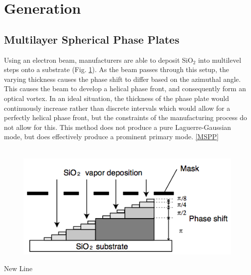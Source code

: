 \documentclass[10pt]{article}
\begin{document}
\section*{Generation}
\subsection*{Multilayer Spherical Phase Plates}
Using an electron beam, manufacturers are able to deposit SiO$_2$ into multilevel steps onto a substrate (Fig. \ref{mspp}). As the beam passes through this setup, the varying thickness causes the phase shift to differ based on the azimuthal angle. This causes the beam to develop a helical phase front, and consequently  form an optical vortex. In an ideal situation, the thickness of the phase plate would continuously increase rather than discrete intervals which would allow for a perfectly helical phase front, but the constraints of the manufacturing process do not allow for this. This method does not produce a pure Laguerre-Gaussian mode, but does effectively produce a prominent primary mode. \ref{MSPP}
\\\\

\begin{figure}
\centering
\includegraphics[scale=.5]{MSPP.jpg}
\caption{}
\label{mspp}
\end{figure}
New Line
\end{document}
